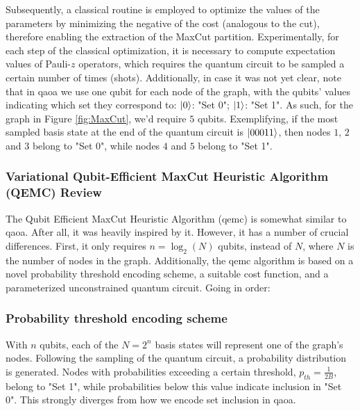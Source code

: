 Subsequently, a classical routine is employed to optimize the values of the parameters by minimizing the negative of the cost (analogous to the cut), therefore enabling the extraction of the MaxCut partition. Experimentally, for each step of the classical optimization, it is necessary to compute expectation values of Pauli-$z$ operators, which requires the quantum circuit to be sampled a certain number of times (shots). Additionally, in case it was not yet clear, note that in \acrshort{qaoa} we use one qubit for each node of the graph, with the qubits' values indicating which set they correspond to: $\ket{0}$: "Set 0"; $\ket{1}$: "Set 1". As such, for the graph in Figure \ref{fig:MaxCut}, we'd require $5$ qubits. Exemplifying, if the most sampled basis state at the end of the quantum circuit is $\ket{00011}$, then nodes $1$, $2$ and $3$ belong to "Set 0", while nodes $4$ and $5$ belong to "Set 1".


\subsubsection{Variational Qubit-Efficient MaxCut Heuristic Algorithm (QEMC) Review}
\label{subsubsection:QEMC}


The Qubit Efficient MaxCut Heuristic Algorithm (\acrshort{qemc}) \cite{tenecohen2023variational} is somewhat similar to \acrshort{qaoa}. After all, it was heavily inspired by it. However, it has a number of crucial differences. First, it only requires $n = \log_2(N)$ qubits, instead of $N$, where $N$ is the number of nodes in the graph. Additionally, the \acrshort{qemc} algorithm is based on a novel probability threshold encoding scheme, a suitable cost function, and a parameterized unconstrained quantum circuit. Going in order:

\subsubsection*{\small Probability threshold encoding scheme}
With $n$ qubits, each of the $N = 2^{n}$ basis states will represent one of the graph's nodes. Following the sampling of the quantum circuit, a probability distribution is generated. Nodes with probabilities exceeding a certain threshold, $p_{th} = \frac{1}{2B}$, belong to "Set 1", while probabilities below this value indicate inclusion in "Set 0". This strongly diverges from how we encode set inclusion in \acrshort{qaoa}.


